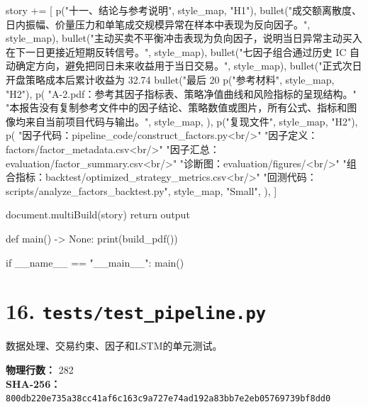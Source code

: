 \documentclass[UTF8,a4paper,fontset=fandol]{ctexart}
\begin{document}
\begin{ProjectCode}
    story += [
        p("十一、结论与参考说明", style_map, "H1"),
        bullet("成交额离散度、日内振幅、价量压力和单笔成交规模异常在样本中表现为反向因子。", style_map),
        bullet("主动买卖不平衡冲击表现为负向因子，说明当日异常主动买入在下一日更接近短期反转信号。", style_map),
        bullet("七因子组合通过历史 IC 自动确定方向，避免把同日未来收益用于当日交易。", style_map),
        bullet("正式次日开盘策略成本后累计收益为 32.74%
        bullet("最后 20%
        p("参考材料", style_map, "H2"),
        p(
            "A-2.pdf：参考其因子指标表、策略净值曲线和风险指标的呈现结构。"
            "本报告没有复制参考文件中的因子结论、策略数值或图片，所有公式、指标和图像均来自当前项目代码与输出。",
            style_map,
        ),
        p("复现文件", style_map, "H2"),
        p(
            "因子代码：pipeline_code/construct_factors.py<br/>"
            "因子定义：factors/factor_metadata.csv<br/>"
            "因子汇总：evaluation/factor_summary.csv<br/>"
            "诊断图：evaluation/figures/<br/>"
            "组合指标：backtest/optimized_strategy_metrics.csv<br/>"
            "回测代码：scripts/analyze_factors_backtest.py",
            style_map,
            "Small",
        ),
    ]

    document.multiBuild(story)
    return output


def main() -> None:
    print(build_pdf())


if __name__ == "__main__":
    main()
\end{ProjectCode}
\clearpage
\section{16. \texttt{tests/test\_pipeline.py}}
数据处理、交易约束、因子和LSTM的单元测试。

\textbf{物理行数：} 282\\
\textbf{SHA-256：} \texttt{800db220e735a38cc41af6c163c9a727e74ad192a83bb7e2eb05769739bf8dd0}
\end{document}
